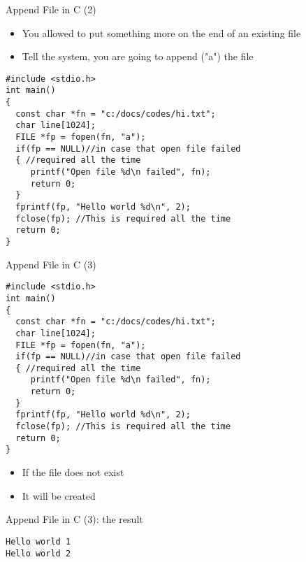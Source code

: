 \begin{frame}[fragile]{Append File in C (2)}
\vspace{-0.1in}
\begin{itemize}
	\item {You allowed to put something more on the end of an existing file}
	\item {Tell the system, you are going to append ("a") the file}
\end{itemize}
\begin{lstlisting}[xleftmargin=0.06\linewidth, linewidth=0.85\linewidth]
#include <stdio.h>
int main()
{
  const char *fn = "c:/docs/codes/hi.txt";
  char line[1024];
  FILE *fp = fopen(fn, "a");
  if(fp == NULL)//in case that open file failed
  { //required all the time
     printf("Open file %d\n failed", fn);
     return 0;
  }
  fprintf(fp, "Hello world %d\n", 2);
  fclose(fp); //This is required all the time
  return 0;
}
\end{lstlisting}
\end{frame}

\begin{frame}[fragile]{Append File in C (3)}
\vspace{-0.1in}
\begin{lstlisting}[xleftmargin=0.06\linewidth, linewidth=0.85\linewidth]
#include <stdio.h>
int main()
{
  const char *fn = "c:/docs/codes/hi.txt";
  char line[1024];
  FILE *fp = fopen(fn, "a");
  if(fp == NULL)//in case that open file failed
  { //required all the time
     printf("Open file %d\n failed", fn);
     return 0;
  }
  fprintf(fp, "Hello world %d\n", 2);
  fclose(fp); //This is required all the time
  return 0;
}
\end{lstlisting}
\begin{itemize}
	\item {If the file does not exist}
	\item {It will be created}
\end{itemize}
\end{frame}

\begin{frame}[fragile]{Append File in C (3): the result}
\vspace{-0.1in}
\begin{lstlisting}
Hello world 1
Hello world 2
\end{lstlisting}
\end{frame}

